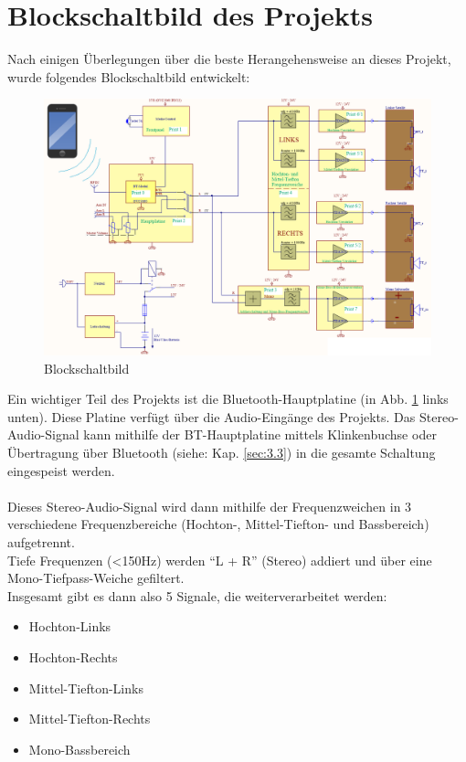 \section{Blockschaltbild des Projekts}\label{sec:3.1}
Nach einigen Überlegungen über die beste Herangehensweise an dieses Projekt, wurde folgendes Blockschaltbild entwickelt:
\begin{figure} [H]
	\centering
	\includegraphics[width=1\textwidth]{img/blockschaltbildV2.png}
	\caption{Blockschaltbild}
	\label{fig:3.1.1}
\end{figure}
Ein wichtiger Teil des Projekts ist die Bluetooth-Hauptplatine (in Abb. \ref{fig:3.1.1} links unten).
Diese Platine verfügt über die Audio-Eingänge des Projekts.
Das Stereo-Audio-Signal kann mithilfe der BT-Hauptplatine mittels Klinkenbuchse oder Übertragung über Bluetooth (siehe: Kap. \ref{sec:3.3}) in die gesamte Schaltung eingespeist werden.
\\ \\
Dieses Stereo-Audio-Signal wird dann mithilfe der Frequenzweichen in 3 verschiedene Frequenzbereiche (Hochton-, Mittel-Tiefton- und Bassbereich) aufgetrennt.
\\
Tiefe Frequenzen (<150Hz) werden \enquote{L + R} (Stereo) addiert und über eine Mono-Tiefpass-Weiche gefiltert.
\\
Insgesamt gibt es dann also 5 Signale, die weiterverarbeitet werden:
\\ 
\begin{itemize}
	\item Hochton-Links
	\item Hochton-Rechts
	\item Mittel-Tiefton-Links
	\item Mittel-Tiefton-Rechts
	\item Mono-Bassbereich
\end{itemize}

